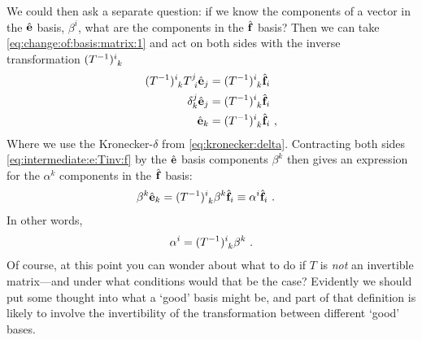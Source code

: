 We could then ask a separate question: if we know the components of a vector in the $\hat{\mathbf{e}}$ basis, $\beta^i$, what are the components in the $\hat{\mathbf{f}}$ basis? Then we can take \eqref{eq:change:of:basis:matrix:1} and act on both sides with the inverse transformation $(T\inv)\aij{i}{k}$
\begin{align}
    (T\inv)\aij{i}{k}T\aij{j}{i}\bas{e}_j &= (T\inv)\aij{i}{k}\bas{f}_i \\
    \delta^j_k \bas{e}_j &= (T\inv)\aij{i}{k}\bas{f}_i\\
    \bas{e}_k &=(T\inv)\aij{i}{k}\bas{f}_i \ ,
    \label{eq:intermediate:e:Tinv:f}
\end{align}
Where we use the Kronecker-$\delta$ from \eqref{eq:kronecker:delta}.
% 
Contracting both sides \eqref{eq:intermediate:e:Tinv:f} by the $\hat{\mathbf{e}}$ basis components $\beta^k$ then gives an expression for the $\alpha^k$ components in the $\hat{\mathbf{f}}$ basis:
\begin{align}
   \beta^k \bas{e}_k &=(T\inv)\aij{i}{k} \beta^k \bas{f}_i \equiv \alpha^i \bas{f}_i \ .
\end{align}
In other words,
\begin{align}
    \alpha^i = (T\inv)\aij{i}{k} \beta^k \ .
\end{align}
Of course, at this point you can wonder about what to do if $T$ is \emph{not} an invertible matrix---and under what conditions would that be the case? Evidently we should put some thought into what a `good' basis might be, and part of that definition is likely to involve the invertibility of the transformation between different `good' bases.

